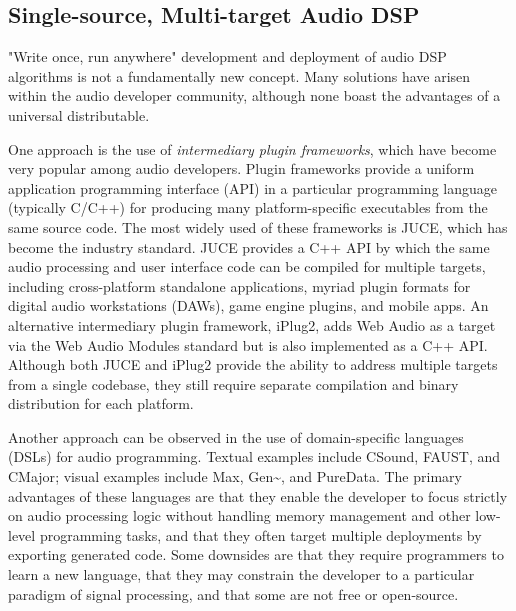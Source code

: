 \documentclass[a4paper]{article}
\begin{document}
\subsection{ Single-source, Multi-target Audio DSP }
"Write once, run anywhere" development and deployment of audio DSP algorithms is not a fundamentally new concept. Many solutions have arisen within the audio developer community, although none boast the advantages of a universal distributable. 


One approach is the use of \textit{intermediary plugin frameworks}, which have become very popular among audio developers\cite{2018_13}. Plugin frameworks provide a uniform application programming interface (API) in a particular programming language (typically C/C++) for producing many platform-specific executables from the same source code. The most widely used of these frameworks is JUCE\cite{JUCE}, which has become the industry standard. JUCE provides a C++ API by which the same audio processing and user interface code can be compiled for multiple targets, including cross-platform standalone applications, myriad plugin formats for digital audio workstations (DAWs), game engine plugins, and mobile apps. An alternative intermediary plugin framework, iPlug2\cite{2018_13}, adds Web Audio as a target via the Web Audio Modules\cite{10.1145/3487553.3524225} standard but is also implemented as a C++ API. Although both JUCE and iPlug2 provide the ability to address multiple targets from a single codebase, they still require separate compilation and binary distribution for each platform. 

Another approach can be observed in the use of domain-specific languages (DSLs) for audio programming. Textual examples include CSound\cite{lazzarini2016csound}, FAUST\cite{orlarey:hal-02159014}, and CMajor\cite{huangc}; visual examples include Max\cite{MaxMSP8}, Gen\textasciitilde\cite{wakefield2012real}, and PureData\cite{puckette_puredata_1997}. The primary advantages of these languages are that they enable the developer to focus strictly on audio processing logic without handling memory management and other low-level programming tasks, and that they often target multiple deployments by exporting generated code. Some downsides are that they require programmers to learn a new language, that they may constrain the developer to a particular paradigm of signal processing, and that some are not free or open-source. 
\end{document}

